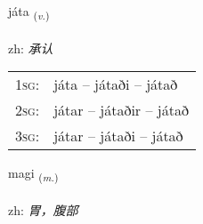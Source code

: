 \documentclass[frontgrid, backgrid]{flacards}\usepackage[]{graphicx}\usepackage[]{color}
\begin{document}
\renewcommand{\blhead}{\vskip5pt {\small\bfseries\footnotesize Sagnorð | 动词 }}
\renewcommand{\bcfoot}{\vskip5pt \hspace{2pt}{\small\bfseries\footnotesize 2K}}


{játa \small{\textsubscript{(\textit{v.})}} \\[1ex] %
\textphonetic{[jauːta]} \\
zh: \emph{承认} \\  [2ex]
\renewcommand*{\arraystretch}{0.8}
\begin{tabular}{p{1cm}l}
\textsc{1sg}: & játa -- játaði -- játað \\ 
\textsc{2sg}: & játar -- játaðir -- játað \\ 
\textsc{3sg}: & játar -- játaði -- játað \\ 
\end{tabular}
}

\renewcommand{\flhead}{\vskip5pt \fboxsep=0pt {\small\bfseries\footnotesize Nafnorð | 名词}}
\renewcommand{\fcfoot}{\vskip5pt \fboxsep=0pt \hspace{2pt}{\small\bfseries\footnotesize 2K}}

\renewcommand{\blhead}{\vskip5pt {\small\bfseries\footnotesize Nafnorð | 名词 }}
\renewcommand{\bcfoot}{\vskip5pt \hspace{2pt}{\small\bfseries\footnotesize 2K}}


{magi \small{\textsubscript{(\textit{m.})}} \\[1ex] %
\textphonetic{[maijɪ]} \\
zh: \emph{胃，腹部} \\  [2ex]
\renewcommand*{\arraystretch}{0.8}
}

\renewcommand{\flhead}{\vskip5pt \fboxsep=0pt {\small\bfseries\footnotesize Nafnorð | 名词}}
\renewcommand{\fcfoot}{\vskip5pt \fboxsep=0pt \hspace{2pt}{\small\bfseries\footnotesize 2K}}
\end{document}
